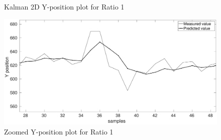 \documentclass[12pt]{article}
\begin{document}
\begin{figure}[h]
\begin{minipage}{0.5\textwidth}
	\caption{Kalman 2D Y-position plot for Ratio 1}
	\label{fig:kalman 2D YRat1}
\end{minipage}%
\begin{minipage}{0.5\textwidth}
\centering
	\includegraphics[width = \textwidth]{./Figures/part2Ratio1Yzoomed.eps}
	\caption{ Zoomed Y-position plot for Ratio 1}
	\label{fig: kalman 2D YRat1 zoom}
\end{minipage}
\end{figure}
\end{document}
